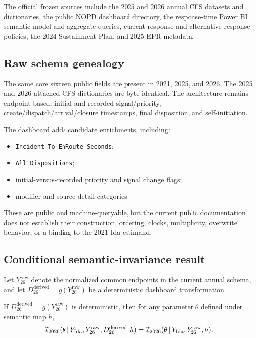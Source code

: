 \documentclass[11pt]{article}
\begin{document}
The official frozen sources include the 2025 and 2026 annual CFS datasets and dictionaries, the public NOPD dashboard directory, the response-time Power BI semantic model and aggregate queries, current response and alternative-response policies, the 2024 Sustainment Plan, and 2025 EPR metadata.

\subsection{Raw schema genealogy}

The same core sixteen public fields are present in 2021, 2025, and 2026. The 2025 and 2026 attached CFS dictionaries are byte-identical. The architecture remains endpoint-based: initial and recorded signal/priority, create/dispatch/arrival/closure timestamps, final disposition, and self-initiation.

The dashboard adds candidate enrichments, including:
\begin{itemize}
\item \texttt{Incident\_To\_EnRoute\_Seconds};
\item \texttt{All Dispositions};
\item initial-versus-recorded priority and signal change flags;
\item modifier and source-detail categories.
\end{itemize}
These are public and machine-queryable, but the current public documentation does not establish their construction, ordering, clocks, multiplicity, overwrite behavior, or a binding to the 2021 Ida estimand.

\subsection{Conditional semantic-invariance result}

Let $Y_{26}^{\mathrm{raw}}$ denote the normalized common endpoints in the current annual schema, and let $D_{26}^{\mathrm{derived}}=g(Y_{26}^{\mathrm{raw}})$ be a deterministic dashboard transformation.

\begin{plainbox}[title=Theorem 4: deterministic public transforms do not contract their raw-input identified set]
If $D_{26}^{\mathrm{derived}}=g(Y_{26}^{\mathrm{raw}})$ is deterministic, then for any parameter $\theta$ defined under semantic map $h$,
\begin{equation}
\mathcal{I}_{2026}(\theta\,|\, Y_{\mathrm{Ida}},Y_{26}^{\mathrm{raw}},D_{26}^{\mathrm{derived}},h)
=
\mathcal{I}_{2026}(\theta\,|\, Y_{\mathrm{Ida}},Y_{26}^{\mathrm{raw}},h).
\label{eq:deterministic_no_gain}
\end{equation}
\end{plainbox}
\end{document}
